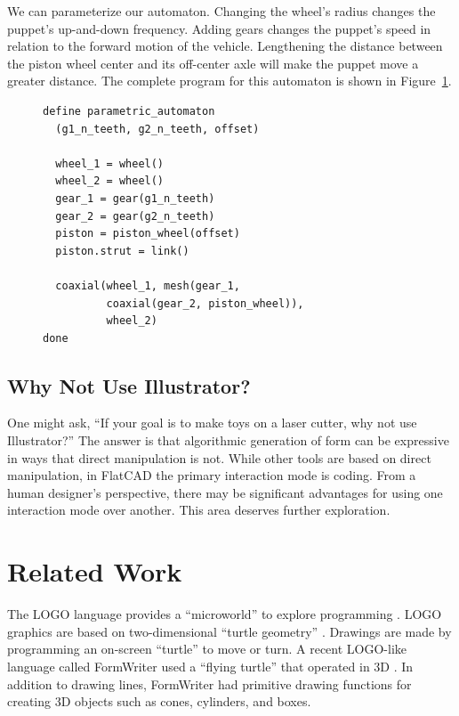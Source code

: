 \documentclass[times, 10pt,twocolumn]{article}
\makeatletter
\newenvironment{subfloat}%
{\def\caption##1{\gdef\subcapsave{\relax##1}}%
\let\subcapsave=\@empty %
\let\sf@oldlabel=\label 
\def\label##1{\xdef\sublabsave{\noexpand\label{##1}}}%
\let\sublabsave\relax %
\setbox\subfigbox\hbox 
\bgroup}%
{\egroup %
\let\label=\sf@oldlabel 
\subfigure[\subcapsave]{\box\subfigbox}}%
\makeatother
\begin{document}
We can parameterize our automaton. Changing the wheel's radius changes
the puppet's up-and-down frequency. Adding gears changes the puppet's
speed in relation to the forward motion of the vehicle. Lengthening
the distance between the piston wheel center and its off-center axle
will make the puppet move a greater distance. The complete program for
this automaton is shown in Figure~\ref{fig:automaton-parameteric}.

\begin{figure}[h]
  \begin{subfloat}
    \begin{minipage}{2.6in}
      \footnotesize
\begin{verbatim}
define parametric_automaton
  (g1_n_teeth, g2_n_teeth, offset)

  wheel_1 = wheel()
  wheel_2 = wheel()
  gear_1 = gear(g1_n_teeth)
  gear_2 = gear(g2_n_teeth)
  piston = piston_wheel(offset)
  piston.strut = link()

  coaxial(wheel_1, mesh(gear_1, 
          coaxial(gear_2, piston_wheel)), 
          wheel_2)
done
\end{verbatim}
    \end{minipage}
  \end{subfloat}
  \caption{A parametric version of the toy vehicle automaton.}
  \label{fig:automaton-parameteric}
\end{figure}

\subsection{Why Not Use Illustrator?}

One might ask, ``If your goal is to make toys on a laser cutter, why
not use Illustrator?''  The answer is that algorithmic generation of
form can be expressive in ways that direct manipulation is not. While
other tools are based on direct manipulation, in \nohyphens{FlatCAD}
the primary interaction mode is coding. From a human designer's
perspective, there may be significant advantages for using one
interaction mode over another. This area deserves further
exploration.

\section{Related Work}

The LOGO language provides a ``microworld'' to explore programming
\cite{papert-mindstorms}. LOGO graphics are based on two-dimensional
``turtle geometry'' \cite{abelson-turtle-geometry}. Drawings are made
by programming an on-screen ``turtle'' to move or turn. A recent
LOGO-like language called FormWriter used a ``flying turtle'' that
operated in 3D \cite{gross-formwriter}. In addition to drawing lines,
FormWriter had primitive drawing functions for creating 3D objects
such as cones, cylinders, and boxes.
\end{document}
